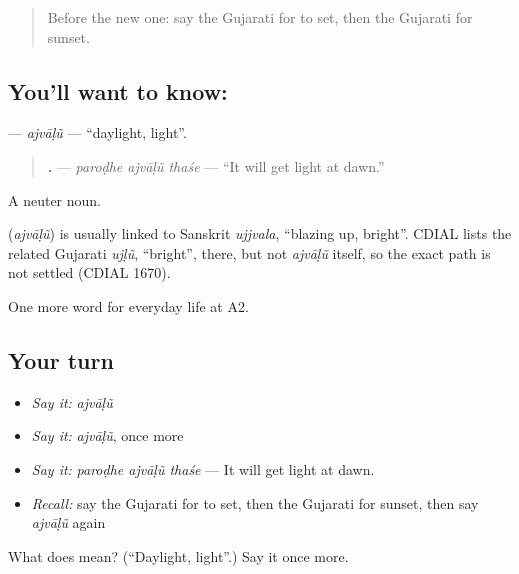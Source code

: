 \label{lesson:GU-C218-ajvalu}



\begin{quote}
Before the new one: say the Gujarati for to set, then the Gujarati for sunset.
\end{quote}

\subsection*{You'll want to know: }
\textbf{} — \emph{ajvāḷũ} — \textquotedblleft{}daylight, light\textquotedblright{}.

\begin{quote}
\textbf{  .} — \emph{paroḍhe ajvāḷũ thaśe} — \textquotedblleft{}It will get light at dawn.\textquotedblright{}
\end{quote}

A neuter noun.

\begin{cousinweb}
\textbf{} (\emph{ajvāḷũ}) is usually linked to Sanskrit \emph{ujjvala}, \textquotedblleft{}blazing up, bright\textquotedblright{}. CDIAL lists the related Gujarati \emph{ujḷũ}, \textquotedblleft{}bright\textquotedblright{}, there, but not \emph{ajvāḷũ} itself, so the exact path is not settled (CDIAL 1670).
\end{cousinweb}

\begin{grammarlens}[title={What you've built}]
One more word for everyday life at A2.
\end{grammarlens}

\subsection*{Your turn}
\begin{itemize}
\raggedright
  \item \emph{Say it:} \emph{ajvāḷũ}
  \item \emph{Say it:} \emph{ajvāḷũ}, once more
  \item \emph{Say it:} \emph{paroḍhe ajvāḷũ thaśe} — It will get light at dawn.
  \item \emph{Recall:} say the Gujarati for to set, then the Gujarati for sunset, then say \emph{ajvāḷũ} again
\end{itemize}

\begin{tcolorbox}[breakable,colback=teal!4,colframe=teal!35!black,title={Before you move on}]
What does  mean? (\textquotedblleft{}Daylight, light\textquotedblright{}.) Say it once more.
\end{tcolorbox}
